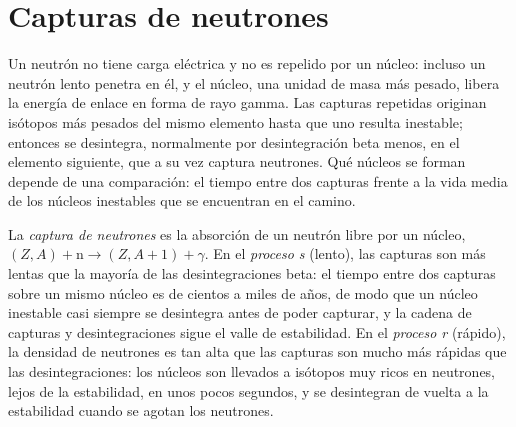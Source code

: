\section{Capturas de neutrones}\label{sec:b3:origin-of-elements:neutrons}

Un neutrón no tiene carga eléctrica y no es repelido por un núcleo: incluso
un neutrón lento penetra en él, y el núcleo, una unidad de masa más pesado, libera
la energía de enlace en forma de rayo gamma. Las capturas repetidas originan isótopos más pesados
del mismo elemento hasta que uno resulta inestable; entonces se desintegra,
normalmente por desintegración beta menos, en el elemento siguiente, que a su vez captura
neutrones. Qué núcleos se forman depende de una comparación: el tiempo entre
dos capturas frente a la vida media de los núcleos inestables que se encuentran en el
camino.

\begin{definition}\label{def:b3:origin-of-elements:s-process}
La \emph{captura de neutrones} es la absorción de un
neutrón libre por un núcleo, $(Z, A) + \mathrm{n} \to (Z, A+1) + \gamma$.
En el \emph{proceso s} (lento), las capturas
son más lentas que la mayoría de las desintegraciones beta: el tiempo entre dos capturas sobre un mismo
núcleo es de cientos a miles de años, de modo que un núcleo inestable
casi siempre se desintegra antes de poder capturar, y la cadena de capturas
y desintegraciones sigue el valle de estabilidad. En el
\emph{proceso r} (rápido), la densidad de neutrones
es tan alta que las capturas son mucho más rápidas que las desintegraciones: los núcleos son
llevados a isótopos muy ricos en neutrones, lejos de la estabilidad, en unos pocos
segundos, y se desintegran de vuelta a la estabilidad cuando se agotan los neutrones.
\end{definition}

